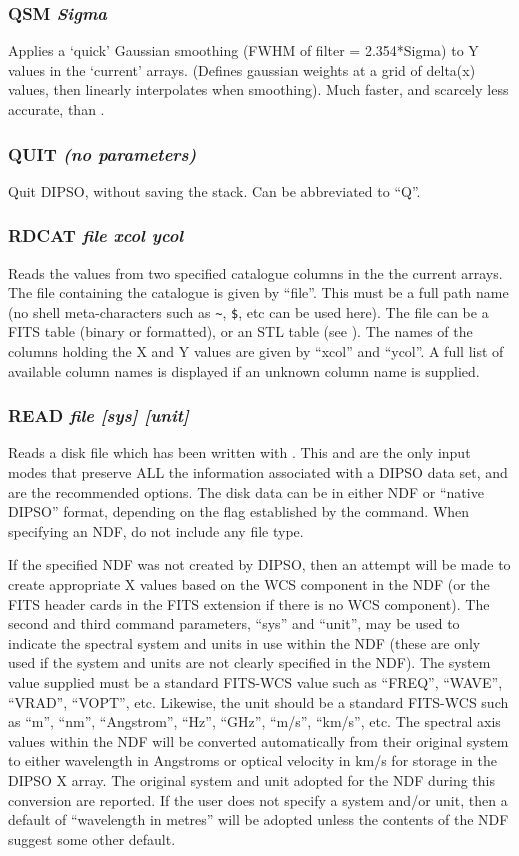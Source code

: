 \documentclass[twoside,11pt,noabs,nolof]{starlink}
\providecommand{\dipcom}[3]{\subsubsection*{\label{COM:#1}\xlabel{COM:#1}\textbf{#1} \emph{#2}}}
\begin{document}
\dipcom{QSM}{Sigma}{Applies a 'quick' Gaussian smoothing to an array}
Applies a `quick' Gaussian smoothing (FWHM of filter = 2.354*Sigma) to
Y values in the `current' arrays. (Defines gaussian weights at a grid
of delta(x) values, then linearly interpolates when smoothing). Much
faster, and scarcely less accurate, than .

\dipcom{QUIT}{(no parameters)}{Quit}
Quit DIPSO, without saving the stack. Can be abbreviated to ``Q''.

\dipcom{RDCAT}{file xcol ycol}{Reads X and Y values from a catalogue into
the current arrays}
Reads the values from two specified catalogue columns in the the current
arrays. The file containing the catalogue is given by ``file''. This must
be a full path name (no shell meta-characters such as \verb+~+, \verb+$+,
etc can be used here). The file can be a FITS table (binary or formatted),
or an STL table (see  ). The names of the columns
holding the X and Y values are given by ``xcol'' and ``ycol''. A full list
of available column names is displayed if an unknown column name is supplied.

\dipcom{READ}{file [sys] [unit]}{Reads data from a disk file to the current arrays (see {\texttt{WRITE}})}
Reads a disk file which has been written with
.  This and 
are the
only input modes that preserve ALL the information associated with a DIPSO
data set, and are the recommended options. The disk data can be in either NDF or
``native DIPSO'' format, depending on the flag established by the 
command. When specifying an NDF, do not include any file type.

If the specified NDF was not created by DIPSO, then an attempt will be
made to create appropriate X values based on the WCS component in the
NDF (or the FITS header cards in the FITS extension if there is no WCS
component). The second and third command parameters, ``sys'' and ``unit'',
may be used to indicate the spectral system and units in use within the NDF
(these are only used if the system and units are not clearly specified in
the NDF). The system value supplied must be a standard FITS-WCS value such as
``FREQ'', ``WAVE'', ``VRAD'', ``VOPT'', etc. Likewise, the unit should be
a standard FITS-WCS such as ``m'', ``nm'', ``Angstrom'', ``Hz'', ``GHz'',
``m/s'', ``km/s'', etc. The spectral axis values within the NDF will be
converted automatically from their original system to either wavelength in
Angstroms or optical velocity in km/s for storage in the DIPSO X array. The
original system and unit adopted for the NDF during this conversion are
reported. If the user does not specify a system and/or unit, then a
default of ``wavelength in metres'' will be adopted unless the contents
of the NDF suggest some other default.
\end{document}
